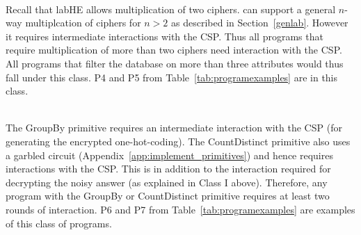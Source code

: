 \\
Recall that \textsf{labHE} allows multiplication of two ciphers. \system can support a general $n$-way multiplcation of ciphers for $n > 2$ as described in Section~\ref{genlab}. However it requires intermediate interactions with the \textsf{CSP}. Thus all \system programs that require multiplication of more than two ciphers need interaction with the \textsf{CSP}.  All programs that filter the database on more than three attributes would thus fall under this class. P4 and P5 from Table~\ref{tab:programexamples} are in this class.

\\
 The \textsf{GroupBy} primitive requires an intermediate interaction with the \textsf{CSP} (for generating the encrypted one-hot-coding). The \textsf{CountDistinct} primitive also uses a garbled circuit (Appendix~\ref{app:implement_primitives}) and hence requires interactions with the \textsf{CSP}. This is in addition to the interaction required for decrypting the noisy answer (as explained in Class I above). Therefore, any program with the \textsf{GroupBy} or \textsf{CountDistinct} primitive requires at least two rounds of interaction. P6 and P7 from Table~\ref{tab:programexamples} are examples of this class of \system programs. 


